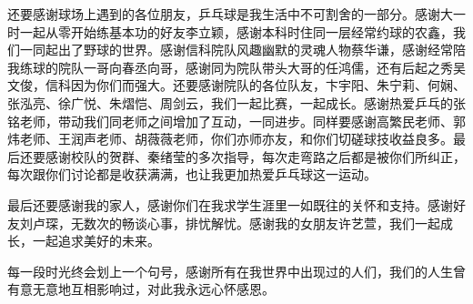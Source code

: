还要感谢球场上遇到的各位朋友，乒乓球是我生活中不可割舍的一部分。感谢大一时一起从零开始练基本功的好友李立颖，感谢本科时住同一层经常约球的农鑫，我们一同起出了野球的世界。感谢信科院队风趣幽默的灵魂人物蔡华谦，感谢经常陪我练球的院队一哥向春丞向哥，感谢同为院队带头大哥的任鸿儒，还有后起之秀吴文俊，信科因为你们而强大。还要感谢院队的各位队友，卞宇阳、朱宁莉、何娴、张泓亮、徐广悦、朱熠恺、周剑云，我们一起比赛，一起成长。感谢热爱乒乓的张铭老师，带动我们同老师之间增加了互动，一同进步。同样要感谢高繁民老师、郭炜老师、王润声老师、胡薇薇老师，你们亦师亦友，和你们切磋球技收益良多。最后还要感谢校队的贺群、秦绪莹的多次指导，每次走弯路之后都是被你们所纠正，每次跟你们讨论都是收获满满，也让我更加热爱乒乓球这一运动。

最后还要感谢我的家人，感谢你们在我求学生涯里一如既往的关怀和支持。感谢好友刘卢琛，无数次的畅谈心事，排忧解忧。感谢我的女朋友许艺萱，我们一起成长，一起追求美好的未来。

每一段时光终会划上一个句号，感谢所有在我世界中出现过的人们，我们的人生曾有意无意地互相影响过，对此我永远心怀感恩。

